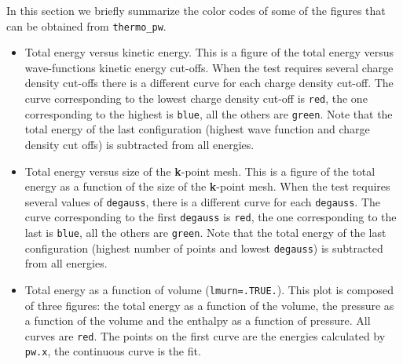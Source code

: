 \documentclass[12pt,a4paper,twoside]{report}
\begin{document}
In this section we briefly summarize the color codes of some of the figures
that can be obtained from \texttt{thermo\_pw}.

\begin{itemize} 
\item
Total energy versus kinetic energy. This is a figure of the total
energy versus wave-functions kinetic energy cut-offs. When the test
requires several charge density cut-offs there is a different curve
for each charge density cut-off. The curve corresponding to the lowest
charge density cut-off is \texttt{red}, the one corresponding to the
highest is \texttt{blue}, all the others are \texttt{green}.
Note that the total energy of the last configuration (highest wave function
and charge density cut offs) is subtracted from all energies.

\item
Total energy versus size of the {\bf k}-point mesh. This is a 
figure of the total energy as a function of the size of the {\bf k}-point
mesh. When the test requires several values of \texttt{degauss}, there
is a different curve for each \texttt{degauss}. The curve corresponding to the
first \texttt{degauss} is \texttt{red}, the one corresponding to the
last is \texttt{blue}, all the others are \texttt{green}.          
Note that the total energy of the last configuration (highest number of
points and lowest \texttt{degauss}) is subtracted from all energies.

\item
Total energy as a function of volume (\texttt{lmurn=.TRUE.}). 
This plot is composed of three figures: the total energy as a function of the
volume, the pressure as a function of the volume and the enthalpy
as a function of pressure. All curves are \texttt{red}.   
The points on the first curve are the energies calculated by 
\texttt{pw.x}, the continuous curve is the fit.


\end{itemize}
\end{document}
